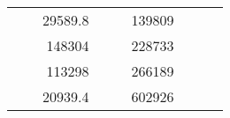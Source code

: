 \begin{table}[H]
\begin{tabular}{|ccrccrccc}
\multicolumn{1}{|c|}{\cellcolor[HTML]{FFFFC7}}                                & \multicolumn{1}{c|}{\cellcolor[HTML]{DDFDFF}}                      & \multicolumn{1}{r|}{\cellcolor[HTML]{DAE8FC}29589.8}   & \multicolumn{1}{c|}{\cellcolor[HTML]{FFFFC7}}                                & \multicolumn{1}{c|}{\cellcolor[HTML]{DDFDFF}}                       & \multicolumn{1}{r|}{\cellcolor[HTML]{DDFDFF}139809}    &                                                                              &                                                                    &                                                        \\ \cline{3-3} \cline{6-6}
\multicolumn{1}{|c|}{\cellcolor[HTML]{FFFFC7}}                                & \multicolumn{1}{c|}{\cellcolor[HTML]{DDFDFF}}                      & \multicolumn{1}{r|}{\cellcolor[HTML]{DDFDFF}148304}    & \multicolumn{1}{c|}{\cellcolor[HTML]{FFFFC7}}                                & \multicolumn{1}{c|}{\cellcolor[HTML]{DDFDFF}}                       & \multicolumn{1}{r|}{\cellcolor[HTML]{DAE8FC}228733}    &                                                                              &                                                                    &                                                        \\ \cline{3-3} \cline{6-6}
\multicolumn{1}{|c|}{\cellcolor[HTML]{FFFFC7}}                                & \multicolumn{1}{c|}{\cellcolor[HTML]{DDFDFF}}                      & \multicolumn{1}{r|}{\cellcolor[HTML]{DAE8FC}113298}    & \multicolumn{1}{c|}{\cellcolor[HTML]{FFFFC7}}                                & \multicolumn{1}{c|}{\cellcolor[HTML]{DDFDFF}}                       & \multicolumn{1}{r|}{\cellcolor[HTML]{DDFDFF}266189}    &                                                                              &                                                                    &                                                        \\ \cline{3-3} \cline{6-6}
\multicolumn{1}{|c|}{\cellcolor[HTML]{FFFFC7}}                                & \multicolumn{1}{c|}{\cellcolor[HTML]{DDFDFF}}                      & \multicolumn{1}{r|}{\cellcolor[HTML]{DDFDFF}20939.4}   & \multicolumn{1}{c|}{\cellcolor[HTML]{FFFFC7}}                                & \multicolumn{1}{c|}{\cellcolor[HTML]{DDFDFF}}                       & \multicolumn{1}{r|}{\cellcolor[HTML]{DAE8FC}602926}    &                                                                              &                                                                    &                                                        \\ \cline{3-3} \cline{6-6}

\end{tabular}
\end{table}
